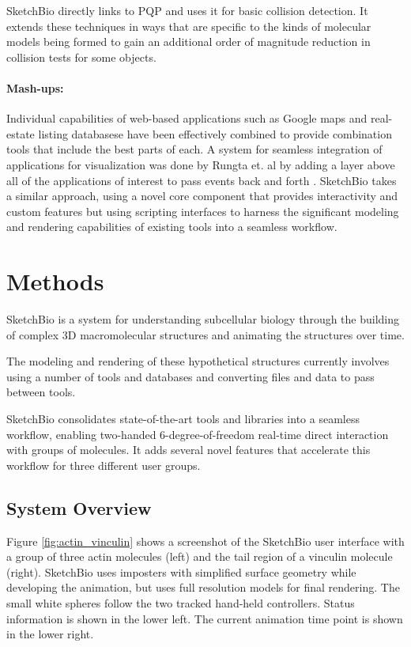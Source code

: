 \documentclass[twocolumn]{bmcart}%
\begin{document}
SketchBio directly links to PQP and uses it for basic collision detection.
It extends these techniques in ways that are specific to the kinds of molecular models being formed to gain an additional order of magnitude reduction in collision tests for some objects.

\paragraph*{Mash-ups:}
Individual capabilities of web-based applications such as Google maps and real-estate listing databasese have been effectively combined to provide combination tools that include the best parts of each.
A system for seamless integration of applications for visualization was done by Rungta et. al by adding a layer above all of the applications of interest to pass events back and forth \cite{rungta2013manyvis}.
SketchBio takes a similar approach, using a novel core component that provides interactivity and custom features but using scripting interfaces to harness the significant modeling and rendering capabilities of existing tools into a seamless workflow.

\section*{Methods}

SketchBio is a system for understanding subcellular biology through the building of complex 3D macromolecular structures and animating the structures over time.

The modeling and rendering of these hypothetical structures currently involves using a number of tools and databases and converting files and data to pass between tools.

SketchBio consolidates state-of-the-art tools and libraries into a seamless workflow, enabling two-handed 6-degree-of-freedom real-time direct interaction with groups of molecules.
It adds several novel features that accelerate this workflow for three different user groups.

\subsection*{System Overview}

Figure \ref{fig:actin_vinculin} shows a screenshot of the SketchBio user interface with a group of three actin molecules (left) and the tail region of a vinculin molecule (right).
SketchBio uses imposters with simplified surface geometry while developing the animation, but uses full resolution models for final rendering.
The small white spheres follow the two tracked hand-held controllers. Status information is shown in the lower left.
The current animation time point is shown in the lower right.
\end{document}
